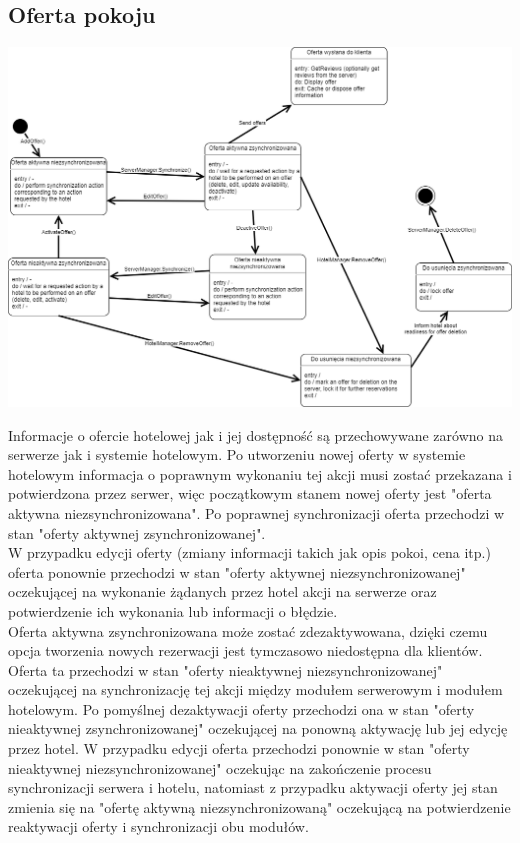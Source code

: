 \documentclass{article}
\begin{document}
\subsection{Oferta pokoju}\label{offerStateDiagram}
\begin{center}
    \includegraphics[scale=0.35]{checkpoint1/OfferStateDiagram.png}
\end{center}
\indent \indent Informacje o ofercie hotelowej jak i jej dostępność są przechowywane zarówno na serwerze jak i systemie hotelowym. Po utworzeniu nowej oferty w systemie hotelowym informacja o poprawnym wykonaniu tej akcji musi zostać przekazana i potwierdzona przez serwer, więc początkowym stanem nowej oferty jest "oferta aktywna niezsynchronizowana". Po poprawnej synchronizacji oferta przechodzi w stan "oferty aktywnej zsynchronizowanej".\\
\indent W przypadku edycji oferty (zmiany informacji takich jak opis pokoi, cena itp.) oferta ponownie przechodzi w stan "oferty aktywnej niezsynchronizowanej" oczekującej na wykonanie żądanych przez hotel akcji na serwerze oraz potwierdzenie ich wykonania lub informacji o błędzie. \\
\indent Oferta aktywna zsynchronizowana może zostać zdezaktywowana, dzięki czemu opcja tworzenia nowych rezerwacji jest tymczasowo niedostępna dla klientów. Oferta ta przechodzi w stan "oferty nieaktywnej niezsynchronizowanej" oczekującej na synchronizację tej akcji między modułem serwerowym i modułem hotelowym. Po pomyślnej dezaktywacji oferty przechodzi ona w stan "oferty nieaktywnej zsynchronizowanej" oczekującej na ponowną aktywację lub jej edycję przez hotel. W przypadku edycji oferta przechodzi ponownie w stan "oferty nieaktywnej niezsynchronizowanej" oczekując na zakończenie procesu syn\-chro\-nizacji serwera i hotelu, natomiast z przypadku aktywacji oferty jej stan zmienia się na "ofertę aktywną niezsynchronizowaną" oczekującą na potwierdzenie reaktywacji oferty i synchronizacji obu modułów.\\
\end{document}
